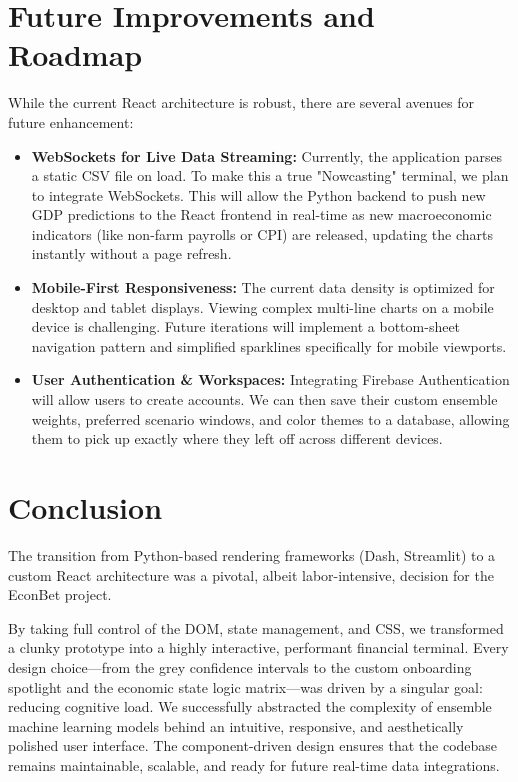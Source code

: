 \documentclass[12pt]{article}
\begin{document}
\section{Future Improvements and Roadmap}

While the current React architecture is robust, there are several avenues for future enhancement:

\begin{itemize}
    \item \textbf{WebSockets for Live Data Streaming:} Currently, the application parses a static CSV file on load. To make this a true "Nowcasting" terminal, we plan to integrate WebSockets. This will allow the Python backend to push new GDP predictions to the React frontend in real-time as new macroeconomic indicators (like non-farm payrolls or CPI) are released, updating the charts instantly without a page refresh.
    \item \textbf{Mobile-First Responsiveness:} The current data density is optimized for desktop and tablet displays. Viewing complex multi-line charts on a mobile device is challenging. Future iterations will implement a bottom-sheet navigation pattern and simplified sparklines specifically for mobile viewports.
    \item \textbf{User Authentication \& Workspaces:} Integrating Firebase Authentication will allow users to create accounts. We can then save their custom ensemble weights, preferred scenario windows, and color themes to a database, allowing them to pick up exactly where they left off across different devices.
\end{itemize}

\section{Conclusion}

The transition from Python-based rendering frameworks (Dash, Streamlit) to a custom React architecture was a pivotal, albeit labor-intensive, decision for the EconBet project. 

By taking full control of the DOM, state management, and CSS, we transformed a clunky prototype into a highly interactive, performant financial terminal. Every design choice—from the grey confidence intervals to the custom onboarding spotlight and the economic state logic matrix—was driven by a singular goal: reducing cognitive load. We successfully abstracted the complexity of ensemble machine learning models behind an intuitive, responsive, and aesthetically polished user interface. The component-driven design ensures that the codebase remains maintainable, scalable, and ready for future real-time data integrations.
\end{document}
